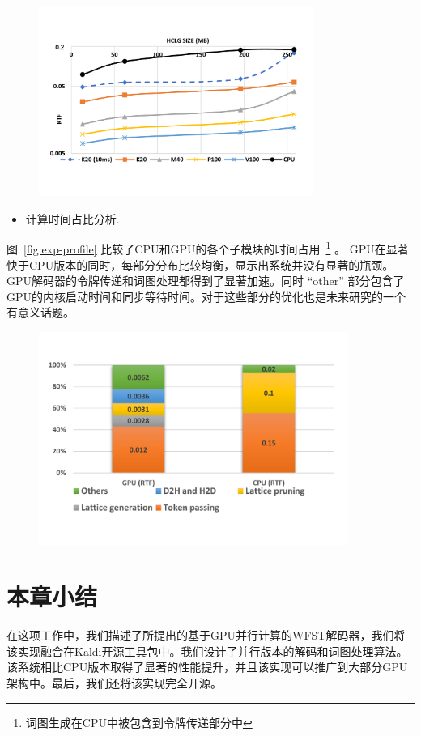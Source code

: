 \begin{figure}[htb]
  \centering
    \captionstyle{\centering}
    \includegraphics[width=0.8\textwidth]{figure/gpu_analysis.pdf}
\end{figure}


\begin{itemize} 
   \item 计算时间占比分析.
   \vspace{-0.25em}
 \end{itemize} 
  图~\ref{fig:exp-profile} 比较了CPU和GPU的各个子模块的时间占用~\footnote{词图生成在CPU中被包含到令牌传递部分中} 。
  GPU在显著快于CPU版本的同时，每部分分布比较均衡，显示出系统并没有显著的瓶颈。GPU解码器的令牌传递和词图处理都得到了显著加速。同时 ``other'' 部分包含了GPU的内核启动时间和同步等待时间。对于这些部分的优化也是未来研究的一个有意义话题。


\begin{figure}[ht]
  \centering
    \captionstyle{\centering}
    \includegraphics[width=0.9\textwidth]{figure/gpu_profile.pdf}
\end{figure}

\section{本章小结}
\label{chap:gpu-sum}

在这项工作中，我们描述了所提出的基于GPU并行计算的WFST解码器，我们将该实现融合在Kaldi开源工具包中。我们设计了并行版本的解码和词图处理算法。该系统相比CPU版本取得了显著的性能提升，并且该实现可以推广到大部分GPU架构中。最后，我们还将该实现完全开源。
